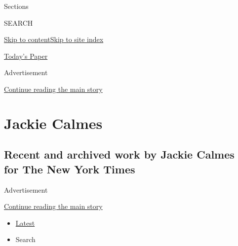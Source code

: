 Sections

SEARCH

\protect\hyperlink{site-content}{Skip to
content}\protect\hyperlink{site-index}{Skip to site index}

\href{https://myaccount.nytimes3xbfgragh.onion/auth/login?response_type=cookie\&client_id=vi}{}

\href{https://www.nytimes3xbfgragh.onion/section/todayspaper}{Today's
Paper}

Advertisement

\protect\hyperlink{after-top}{Continue reading the main story}

\hypertarget{jackie-calmes}{%
\section{Jackie Calmes}\label{jackie-calmes}}

\hypertarget{recent-and-archived-work-by-jackie-calmes-for-the-new-york-times}{%
\subsection{Recent and archived work by Jackie Calmes for The New York
Times}\label{recent-and-archived-work-by-jackie-calmes-for-the-new-york-times}}

Advertisement

\protect\hyperlink{after-mid1}{Continue reading the main story}

\begin{itemize}
\tightlist
\item
  \protect\hyperlink{stream-panel}{Latest}
\item
  Search
\end{itemize}

